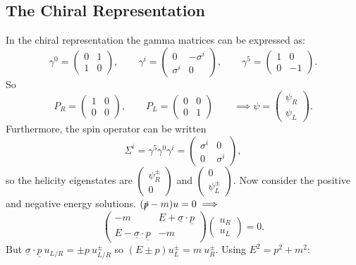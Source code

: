 \documentclass[a4paper,12pt]{article}
\newcommand{\icol}[1]{%
  \left(\begin{smallmatrix}#1\end{smallmatrix}\right)%
}
\begin{document}
\subsection{The Chiral Representation}
%
In the chiral representation the gamma matrices can be expressed as:
\[ \gamma^0 = \left( \begin{array}{cc}
0 & 1  \\
1 & 0  \end{array} \right), \qquad
\gamma^i = \left( \begin{array}{cc}
0 & -\sigma^i  \\
\sigma^i & 0  \end{array} \right), \qquad
\gamma^5 = \left( \begin{array}{cc}
1 & 0 \\
0 & -1     \end{array} \right).\] 
%
So
%
\[ P_R = \left( \begin{array}{cc}
1 & 0  \\
0 & 0  \end{array} \right), \qquad
P_L = \left( \begin{array}{cc}
0 & 0  \\
0 & 1  \end{array} \right) \qquad
\implies
\psi = \left( \begin{array}{c}
\psi_R  \\
\psi_L      \end{array} \right).\] 
%
Furthermore, the spin operator can be written
%
\[ \Sigma^i = \gamma^5\gamma^0\gamma^i = \left( \begin{array}{cc}
\sigma^i & 0  \\
0 & \sigma^i  \end{array} \right), \]
%
so the helicity eigenstates are $\icol{\psi_R^\pm\\0}$ and $\icol{0\\\psi_L^\pm}$. Now consider the positive and negative energy solutions. 
%
$(\slashed{p} - m)u =0 \implies$
%
\[ \left( \begin{array}{cc}
-m & E +\underline{\sigma}\cdot\underline{p}  \\
  E -\underline{\sigma}\cdot\underline{p}& -m  \end{array} \right)
\left( \begin{array}{c}
u_R   \\
u_L  \end{array} \right) = 0.\] 
%
But $\underline{\sigma}\cdot \underline{p}\ u_{L/R} = \pm p\ u_{L/R}^\pm$ so $(E \pm p)u_L^\pm = m\ u_R^\pm$. Using $E^2 = p^2 + m^2$:
\end{document}
